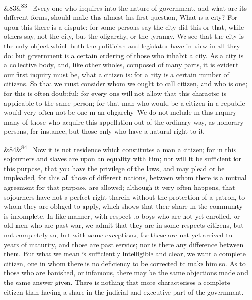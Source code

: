 \documentclass[12pt]{article}
\newcommand{\para}[1][]{\par\noindent\ifx&#1&\else\textsuperscript{\footnotesize #1}~\fi}
\begin{document}
\para[83] Every one who inquires into the nature of government, and what are its different forms, should make this almost his first question, What is a city? For upon this there is a dispute: for some persons say the city did this or that, while others say, not the city, but the oligarchy, or the tyranny. We see that the city is the only object which both the politician and legislator have in view in all they do: but government is a certain ordering of those who inhabit a city. As a city is a collective body, and, like other wholes, composed of many parts, it is evident our first inquiry must be, what a citizen is: for a city is a certain number of citizens. So that we must consider whom we ought to call citizen, and who is one; for this is often doubtful: for every one will not allow that this character is applicable to the same person; for that man who would be a citizen in a republic would very often not be one in an oligarchy. We do not include in this inquiry many of those who acquire this appellation out of the ordinary way, as honorary persons, for instance, but those only who have a natural right to it.

\para[84] Now it is not residence which constitutes a man a citizen; for in this sojourners and slaves are upon an equality with him; nor will it be sufficient for this purpose, that you have the privilege of the laws, and may plead or be impleaded, for this all those of different nations, between whom there is a mutual agreement for that purpose, are allowed; although it very often happens, that sojourners have not a perfect right therein without the protection of a patron, to whom they are obliged to apply, which shows that their share in the community is incomplete. In like manner, with respect to boys who are not yet enrolled, or old men who are past war, we admit that they are in some respects citizens, but not completely so, but with some exceptions, for these are not yet arrived to years of maturity, and those are past service; nor is there any difference between them. But what we mean is sufficiently intelligible and clear, we want a complete citizen, one in whom there is no deficiency to be corrected to make him so. As to those who are banished, or infamous, there may be the same objections made and the same answer given. There is nothing that more characterises a complete citizen than having a share in the judicial and executive part of the government.
\end{document}
